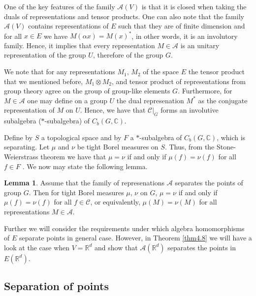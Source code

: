 \documentclass[12pt,a4paper]{report}
\theoremstyle{definition}
\newtheorem{lemma}{Lemma}
\begin{document}
One of the key features of the family $\mathcal{A}(V)$ is that it is closed when taking the duals of representations and tensor products. One can also note that the family $\mathcal{A}(V)$ contains representations of $E$ such that they are of finite dimension and for all $x\in E$ we have $M(\alpha x)=M(x)^*$, in other words, it is an involutory family. Hence, it implies that every representation $M \in \mathcal{A}$ is an unitary representation of the group $U$, therefore of the group $G$.

We note that for any representations $M_1$, $M_2$ of the space $E$ the tensor product that we mentioned before, $M_1 \otimes M_2$, and tensor product of representations from group theory agree on the group of group-like elements $G$. Furthermore, for $M \in \mathcal{A} $ one may define on a group $U$ the dual represenation $M^*$ as the conjugate representation of $M$ on $U$. Hence, we have that $\mathcal{C}|_G$ forms an involutive subalgebra ($\ast$-subalgebra) of $C_b(G,\mathbb{C})$.


Define by $S$ a topological space and by $F$ a $\ast$-subalgebra of $C_b(G,\mathbb{C})$, which is separating. Let $\mu$ and $\nu$ be tight Borel measures on $S$. Thus, from the Stone-Weierstrass theorem we have that $\mu = \nu$ if and only if $\mu(f) = \nu(f)$ for all $f \in F$ \parencite[see][Exercise 7.14 .79]{bogachev2007measure}. We now may state the following lemma.

\begin{lemma}\parencite[see the proof in][]{chevyrev2016characteristic}
	\label{lemma4.2}
	Assume that the family of represenations $\mathcal{A}$ separates the points of group $G$. Then for tight Borel measures $\mu$, $\nu$ on $G$, $\mu = \nu$ if and only if $\mu(f) = \nu(f)$ for all $f \in \mathcal{C}$, or equivalently, $\mu(M) = \nu(M)$ for all representations $M \in \mathcal{A}$.
\end{lemma}

Further we will consider the requirements under which algebra homomorphisms of $E$ separate points in general case. However, in Theorem \ref{thm4.8} we will have a look at the case when $V=\mathbb{R}^d$ and show that $\mathcal{A}(\mathbb{R}^d)$ separates the points in $E(\mathbb{R}^d)$.

\subsection{Separation of points}
\end{document}
